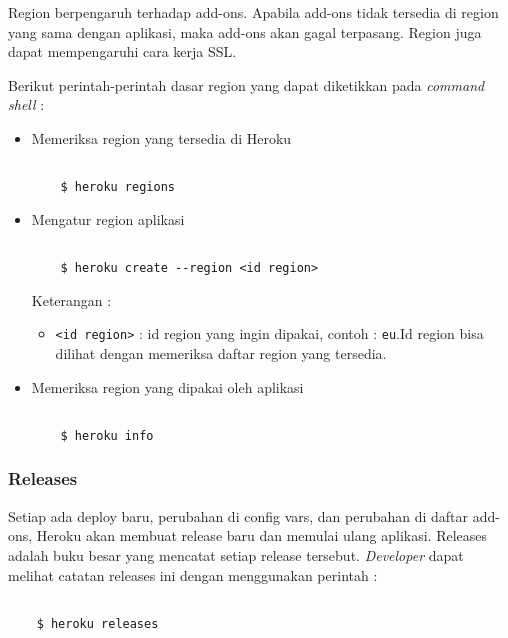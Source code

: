 Region berpengaruh terhadap add-ons. Apabila add-ons tidak tersedia di region yang sama dengan aplikasi, maka add-ons akan gagal terpasang. Region juga dapat mempengaruhi cara kerja SSL.

Berikut perintah-perintah dasar region yang dapat diketikkan pada \textit{command shell} :
\begin{itemize}
\item Memeriksa region yang tersedia di Heroku

\begin{lstlisting}

	$ heroku regions

\end{lstlisting}

\item Mengatur region aplikasi

\begin{lstlisting}

	$ heroku create --region <id region>

\end{lstlisting}
Keterangan :
\begin{itemize}
\item \texttt{<id region>} : id region yang ingin dipakai, contoh : \texttt{eu}.Id region bisa dilihat dengan memeriksa daftar region yang tersedia.
\end{itemize}

\item Memeriksa region yang dipakai oleh aplikasi

\begin{lstlisting}

	$ heroku info

\end{lstlisting}

\end{itemize}

\subsubsection{Releases}
Setiap ada deploy baru, perubahan di config vars, dan perubahan di daftar add-ons, Heroku akan membuat release baru dan memulai ulang aplikasi. Releases adalah buku besar yang mencatat setiap release tersebut. \textit{Developer} dapat melihat catatan releases ini dengan menggunakan perintah :
\begin{lstlisting}

	$ heroku releases

\end{lstlisting}

